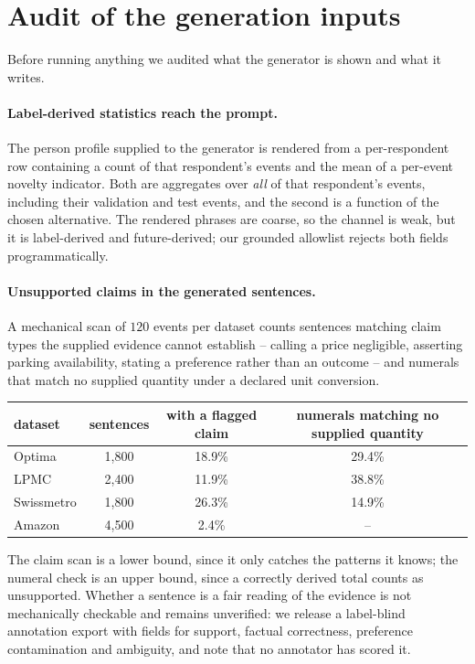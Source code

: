 \section{Audit of the generation inputs}
\label{sec:audit}

Before running anything we audited what the generator is shown and what it writes.

\paragraph{Label-derived statistics reach the prompt.} The person profile supplied to the
generator is rendered from a per-respondent row containing a count of that respondent's events
and the mean of a per-event novelty indicator. Both are aggregates over \emph{all} of that
respondent's events, including their validation and test events, and the second is a function of
the chosen alternative. The rendered phrases are coarse, so the channel is weak, but it is
label-derived and future-derived; our grounded allowlist rejects both fields programmatically.

\paragraph{Unsupported claims in the generated sentences.} A mechanical scan of $120$ events per
dataset counts sentences matching claim types the supplied evidence cannot establish -- calling a
price negligible, asserting parking availability, stating a preference rather than an outcome --
and numerals that match no supplied quantity under a declared unit conversion.

\begin{center}\small
\begin{tabular}{lccc}
\toprule
dataset & sentences & with a flagged claim & numerals matching no supplied quantity \\
\midrule
Optima & 1{,}800 & 18.9\% & 29.4\% \\
LPMC & 2{,}400 & 11.9\% & 38.8\% \\
Swissmetro & 1{,}800 & 26.3\% & 14.9\% \\
Amazon & 4{,}500 & 2.4\% & -- \\
\bottomrule
\end{tabular}
\end{center}

The claim scan is a lower bound, since it only catches the patterns it knows; the numeral check
is an upper bound, since a correctly derived total counts as unsupported. Whether a sentence is a
fair reading of the evidence is not mechanically checkable and remains unverified: we release a
label-blind annotation export with fields for support, factual correctness, preference
contamination and ambiguity, and note that no annotator has scored it.

